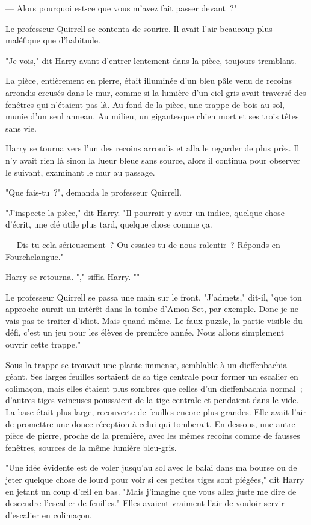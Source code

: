 --- Alors pourquoi est-ce que vous m'avez fait passer devant~?"

Le professeur Quirrell se contenta de sourire. Il avait l'air beaucoup plus maléfique que d'habitude.

"Je vois," dit Harry avant d'entrer lentement dans la pièce, toujours tremblant.

La pièce, entièrement en pierre, était illuminée d'un bleu pâle venu de recoins arrondis creusés dans le mur, comme si la lumière d'un ciel gris avait traversé des fenêtres qui n'étaient pas là. Au fond de la pièce, une trappe de bois au sol, munie d'un seul anneau. Au milieu, un gigantesque chien mort et ses trois têtes sans vie.

Harry se tourna vers l'un des recoins arrondis et alla le regarder de plus près. Il n'y avait rien là sinon la lueur bleue sans source, alors il continua pour observer le suivant, examinant le mur au passage.

"Que fais-tu~?", demanda le professeur Quirrell.

"J'inspecte la pièce," dit Harry. "Il pourrait y avoir un indice, quelque chose d'écrit, une clé utile plus tard, quelque chose comme ça.

--- Dis-tu cela sérieusement~? Ou essaies-tu de nous ralentir~? Réponds en Fourchelangue."

Harry se retourna. "," siffla Harry. ""

Le professeur Quirrell se passa une main sur le front. "J'admets," dit-il, "que ton approche aurait un intérêt dans la tombe d'Amon-Set, par exemple. Donc je ne vais pas te traiter d'idiot. Mais quand même. Le faux puzzle, la partie visible du défi, c'est un jeu pour les élèves de première année. Nous allons simplement ouvrir cette trappe."

Sous la trappe se trouvait une plante immense, semblable à un dieffenbachia géant. Ses larges feuilles sortaient de sa tige centrale pour former un escalier en colimaçon, mais elles étaient plus sombres que celles d'un dieffenbachia normal~; d'autres tiges veineuses poussaient de la tige centrale et pendaient dans le vide. La base était plus large, recouverte de feuilles encore plus grandes. Elle avait l'air de promettre une douce réception à celui qui tomberait. En dessous, une autre pièce de pierre, proche de la première, avec les mêmes recoins comme de fausses fenêtres, sources de la même lumière bleu-gris.

"Une idée évidente est de voler jusqu'au sol avec le balai dans ma bourse ou de jeter quelque chose de lourd pour voir si ces petites tiges sont piégées," dit Harry en jetant un coup d'œil en bas. "Mais j'imagine que vous allez juste me dire de descendre l'escalier de feuilles." Elles avaient vraiment l'air de vouloir servir d'escalier en colimaçon.


